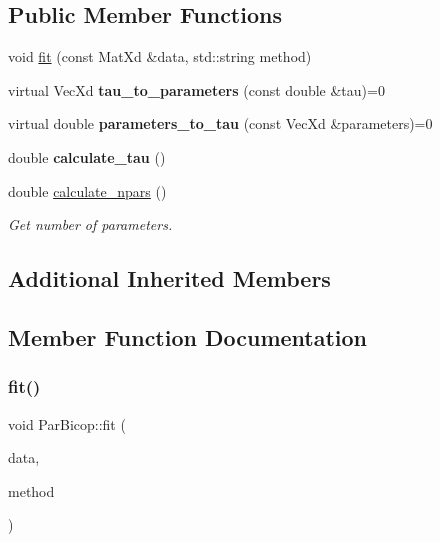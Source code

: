 \subsection*{Public Member Functions}
\begin{DoxyCompactItemize}
\item 
void \hyperlink{class_par_bicop_aeab5e7031792bebc04a401a8f135d3a0}{fit} (const Mat\+Xd \&data, std\+::string method)
\item 
\mbox{\label{class_par_bicop_ae7a6435fa4df9989d38fcbec9666218a}} 
virtual Vec\+Xd {\bfseries tau\+\_\+to\+\_\+parameters} (const double \&tau)=0
\item 
\mbox{\label{class_par_bicop_afa2abb9e5c96798e4c06e79111bb6314}} 
virtual double {\bfseries parameters\+\_\+to\+\_\+tau} (const Vec\+Xd \&parameters)=0
\item 
\mbox{\label{class_par_bicop_af866faf5a92ad12582b50192a033a39c}} 
double {\bfseries calculate\+\_\+tau} ()
\item 
\mbox{\label{class_par_bicop_a190d46ae764f081e2901accade366327}} 
double \hyperlink{class_par_bicop_a190d46ae764f081e2901accade366327}{calculate\+\_\+npars} ()
\begin{DoxyCompactList}\small\item\em Get number of parameters. \end{DoxyCompactList}\end{DoxyCompactItemize}
\subsection*{Additional Inherited Members}


\subsection{Member Function Documentation}
\mbox{\label{class_par_bicop_aeab5e7031792bebc04a401a8f135d3a0}} 
\subsubsection{\texorpdfstring{fit()}{fit()}}
{\footnotesize\ttfamily void Par\+Bicop\+::fit (\begin{DoxyParamCaption}\item[{const Mat\+Xd \&}]{data,  }\item[{std\+::string}]{method }\end{DoxyParamCaption})\hspace{0.3cm}{\ttfamily [virtual]}}

